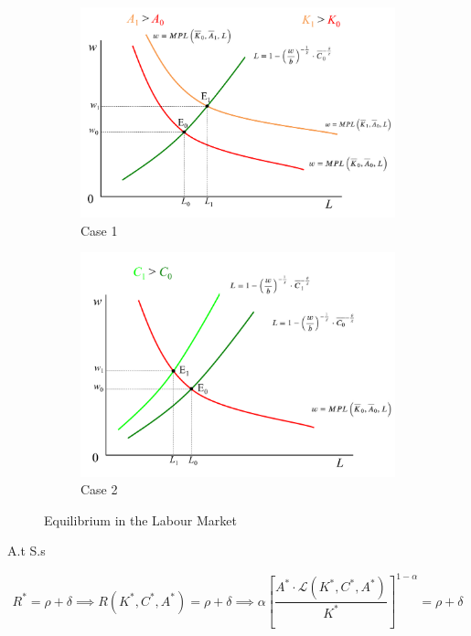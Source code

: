 \begin{figure}[ht]
\centering
\begin{subfigure}{.5\textwidth}
  \centering
  \includegraphics[width=1\linewidth]{3_0_Real_Business_Cycles/e_q_L_1.pdf}
  \caption{Case 1}
  \label{fig:sub1}
\end{subfigure}%
\begin{subfigure}{.5\textwidth}
  \centering
  \includegraphics[width=1\linewidth]{3_0_Real_Business_Cycles/e_q_L_2.pdf}
  \caption{Case 2}
  \label{fig:sub2}
\end{subfigure}
\caption{Equilibrium in the Labour Market}
\label{fig:test}
\end{figure}

A.t S.s

\begin{equation*}
   R ^ { * } = \rho + \delta \implies  R \left( K ^ { * } , C^ { * } , A ^ { * } \right) = \rho + \delta \implies 
   \alpha \left[  \frac{A^* \cdot \mathcal{L}(K^*, C^*, A^*)}{K^*}  \right]^{1 - \alpha} = \rho + \delta
\end{equation*}

